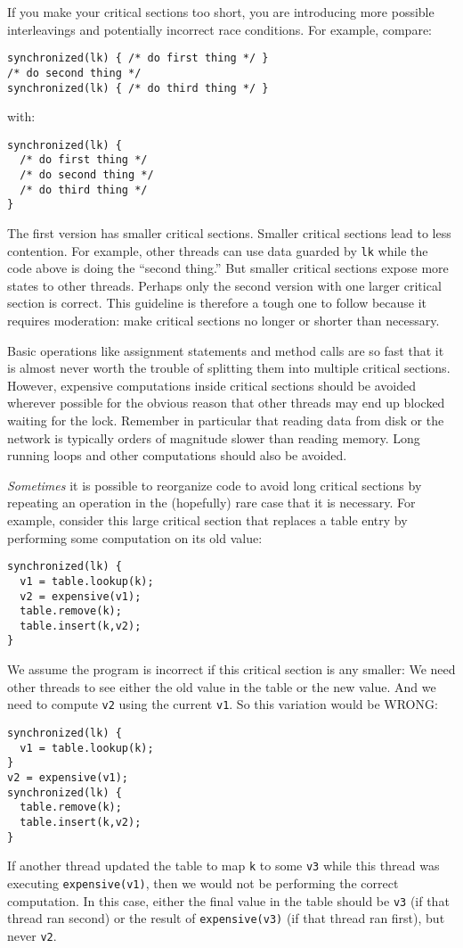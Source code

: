 \documentclass[10pt]{article}
\begin{document}
If you make your critical sections too short, you are introducing more
possible interleavings and potentially incorrect race conditions.  For
example, compare:
\begin{verbatim}
synchronized(lk) { /* do first thing */ }
/* do second thing */
synchronized(lk) { /* do third thing */ }
\end{verbatim}
with:
\begin{verbatim}
synchronized(lk) {
  /* do first thing */
  /* do second thing */
  /* do third thing */
}
\end{verbatim}
The first version has smaller critical sections.  Smaller critical
sections lead to less contention.  For example, other threads can use
data guarded by {\tt lk} while the code above is doing the ``second
thing.''  But smaller critical sections expose more states to other
threads.  Perhaps only the second version with one larger critical
section is correct.  This guideline is therefore a tough one to follow
because it requires moderation: make critical sections no longer or
shorter than necessary.

Basic operations like assignment statements and method calls are so
fast that it is almost never worth the trouble of splitting them into
multiple critical sections.  However, expensive computations inside
critical sections should be avoided wherever possible for the obvious
reason that other threads may end up blocked waiting for the lock.
Remember in particular that reading data from disk or the network is
typically orders of magnitude slower than reading memory.  Long
running loops and other computations should also be avoided.

\emph{Sometimes} it is possible to reorganize code to avoid long
critical sections by repeating an operation in the (hopefully) rare
case that it is necessary.  For example, consider this large critical
section that replaces a table entry by performing some computation on
its old value:
\begin{verbatim}
synchronized(lk) {
  v1 = table.lookup(k);
  v2 = expensive(v1);
  table.remove(k);
  table.insert(k,v2);
}
\end{verbatim}
We assume the program is incorrect if this critical section is any
smaller: We need other threads to see either the old value in the
table or the new value.  And we need to compute {\tt v2} using the
current {\tt v1}.  So this variation would be WRONG:
\begin{verbatim}
synchronized(lk) {
  v1 = table.lookup(k);
}
v2 = expensive(v1);
synchronized(lk) {
  table.remove(k);
  table.insert(k,v2);
}
\end{verbatim}
If another thread updated the table to map {\tt k} to some {\tt v3}
while this thread was executing {\tt expensive(v1)}, then we would not
be performing the correct computation.  In this case, either the final
value in the table should be {\tt v3} (if that thread ran second) or
the result of {\tt expensive(v3)} (if that thread ran first), but
never {\tt v2}.
\end{document}
